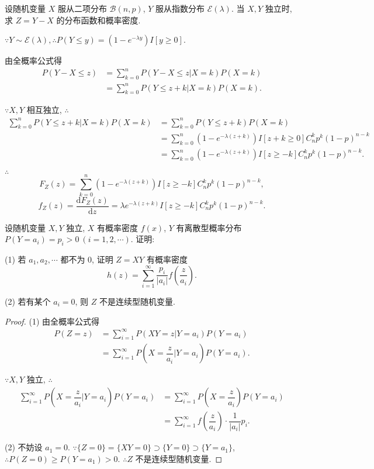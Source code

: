 \documentclass{ctexart}
\begin{document}
\begin{exercise}%
    设随机变量 $X$ 服从二项分布 $\mathcal{B}(n,p)$, $Y$ 服从指数分布 $\mathcal{E}(\lambda)$. 当 $X,Y$ 独立时, 求 $Z=Y-X$ 的分布函数和概率密度.
\end{exercise}
\begin{solution}
    $\because Y\sim\mathcal{E}(\lambda),\therefore P(Y\leq y)=(1-e^{-\lambda y})I[y\geq0]$.
    
    由全概率公式得
    \begin{align*}
        P(Y-X\leq z) & =\sum\limits_{k=0}^nP(Y-X\leq z|X=k)P(X=k) \\
        & =\sum\limits_{k=0}^nP(Y\leq z+k|X=k)P(X=k).
    \end{align*}

    $\because X,Y$ 相互独立, $\therefore$
    \begin{align*}
        \sum\limits_{k=0}^nP(Y\leq z+k|X=k)P(X=k) & =\sum\limits_{k=0}^nP(Y\leq z+k)P(X=k) \\
        & =\sum\limits_{k=0}^n(1-e^{-\lambda(z+k)})I[z+k\geq0]C_n^kp^k(1-p)^{n-k} \\
        & =\sum\limits_{k=0}^n(1-e^{-\lambda(z+k)})I[z\geq-k]C_n^kp^k(1-p)^{n-k}.
    \end{align*}

    $\therefore$
    \[F_Z(z)=\sum\limits_{k=0}^n(1-e^{-\lambda(z+k)})I[z\geq-k]C_n^kp^k(1-p)^{n-k},\]
    \[f_Z(z)=\dfrac{\mathrm{d}F_Z(z)}{\mathrm{d}z}=\lambda e^{-\lambda(z+k)}I[z\geq-k]C_n^kp^k(1-p)^{n-k}.\]
\end{solution}
\addtocounter{exercise}{2}
\begin{exercise}%
    设随机变量 $X,Y$ 独立, $X$ 有概率密度 $f(x)$, $Y$ 有离散型概率分布 $P(Y=a_i)=p_i>0\ (i=1,2,\cdots)$. 证明:
    
    (1) 若 $a_1,a_2,\cdots$ 都不为 $0$, 证明 $Z=XY$ 有概率密度
    \[h(z)=\sum\limits_{i=1}^\infty\dfrac{p_i}{|a_i|}f\left(\dfrac{z}{a_i}\right).\]

    (2) 若有某个 $a_i=0$, 则 $Z$ 不是连续型随机变量.
\end{exercise}
\begin{proof}
    (1) 由全概率公式得
    \begin{align*}
        P(Z=z) & =\sum\limits_{i=1}^\infty P(XY=z|Y=a_i)P(Y=a_i) \\
        & =\sum\limits_{i=1}^\infty P\left(X=\dfrac{z}{a_i}\Big|Y=a_i\right)P(Y=a_i).
    \end{align*}

    $\because X,Y$ 独立, $\therefore$
    \begin{align*}
        \sum\limits_{i=1}^\infty P\left(X=\dfrac{z}{a_i}\Big|Y=a_i\right)P(Y=a_i) & =\sum\limits_{i=1}^\infty P\left(X=\dfrac{z}{a_i}\right)P(Y=a_i) \\
        & =\sum\limits_{i=1}^\infty f\left(\dfrac{z}{a_i}\right)\cdot\dfrac{1}{|a_i|}p_i.
    \end{align*}

    (2) 不妨设 $a_1=0$. $\because\{Z=0\}=\{XY=0\}\supset\{Y=0\}\supset\{Y=a_1\}$, $\therefore P(Z=0)\geq P(Y=a_1)>0$. $\therefore Z$ 不是连续型随机变量.
\end{proof}
\end{document}
